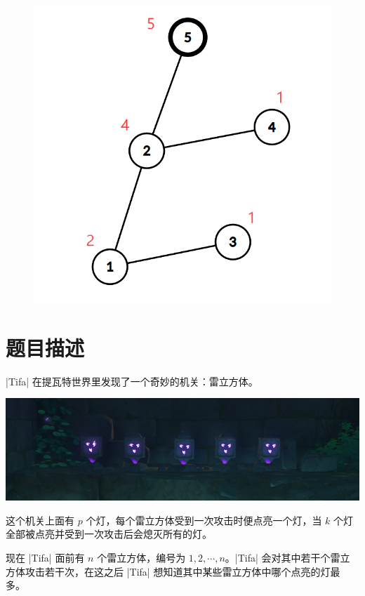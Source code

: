 \documentclass{ctpro}
\begin{document}
\begin{figure}
	\includegraphics[scale=0.14]{images/D_5.png}
\end{figure}

\makeproblem
\section*{题目描述}

|Tifa| 在提瓦特世界里发现了一个奇妙的机关：雷立方体。

\vspace{0.2em}

\begin{center}
    \includegraphics[width=\linewidth]{images/E_1.png}
\end{center}

这个机关上面有 $p$ 个灯，每个雷立方体受到一次攻击时便点亮一个灯，当 $k$ 个灯全部被点亮并受到一次攻击后会熄灭所有的灯。

现在 |Tifa| 面前有 $n$ 个雷立方体，编号为 $1,2, \cdots, n$。|Tifa| 会对其中若干个雷立方体攻击若干次，在这之后 |Tifa| 想知道其中某些雷立方体中哪个点亮的灯最多。
\end{document}
